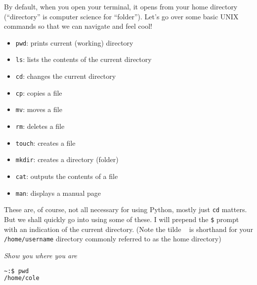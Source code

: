 \documentclass[11pt, twoside, reqno]{book}
\begin{document}
By default, when you open your terminal, it opens from your home directory (``directory'' is computer science for ``folder''). Let's go over some basic UNIX commands so that we can navigate and feel cool!
\begin{itemize} \item \texttt{pwd}: prints current (working) directory\end{itemize}
\begin{itemize} \item \texttt{ls}: lists the contents of the current directory\end{itemize}
\begin{itemize} \item \texttt{cd}: changes the current directory\end{itemize}
\begin{itemize} \item \texttt{cp}: copies a file\end{itemize}
\begin{itemize} \item \texttt{mv}: moves a file\end{itemize}
\begin{itemize} \item \texttt{rm}: deletes a file\end{itemize}
\begin{itemize} \item \texttt{touch}: creates a file\end{itemize}
\begin{itemize} \item \texttt{mkdir}: creates a directory (folder)\end{itemize}
\begin{itemize} \item \texttt{cat}: outputs the contents of a file\end{itemize}
\begin{itemize} \item \texttt{man}: displays a manual page\end{itemize}

These are, of course, not all necessary for using Python, mostly just \texttt{cd} matters. But we shall quickly go into using some of these. I will prepend the \texttt{\$} prompt with an indication of the current directory. (Note the tilde \texttt{~} is shorthand for your \texttt{/home/username} directory commonly referred to as the home directory)

\textit{Show you where you are}
\begin{lstlisting}[language=sh]
~:$ pwd     
/home/cole
\end{lstlisting}
\end{document}
